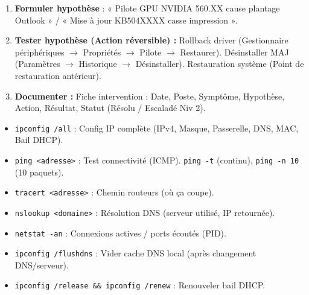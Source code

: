 \documentclass[11pt]{article}
\begin{document}
\begin{methode}
\begin{enumerate}
\begin{enumerate}
\begin{itemize}
                            \item \textbf{Réseau ?} \texttt{ping 1.1.1.1}, \texttt{ping google.fr} (DNS), \texttt{ipconfig /all} (IP, Passerelle, DNS).
                        \end{itemize}
                  \item \textbf{Formuler hypothèse} : « Pilote GPU NVIDIA 560.XX cause plantage Outlook » / « Mise à jour KB504XXXX casse impression ».
                  \item \textbf{Tester hypothèse (Action réversible) :} Rollback driver (Gestionnaire périphériques $\rightarrow$ Propriétés $\rightarrow$ Pilote $\rightarrow$ Restaurer). Désinstaller MAJ (Paramètres $\rightarrow$ Historique $\rightarrow$ Désinstaller). Restauration système (Point de restauration antérieur).
                  \item \textbf{Documenter :} Fiche intervention : Date, Poste, Symptôme, Hypothèse, Action, Résultat, Statut (Résolu / Escaladé Niv 2).
              \end{enumerate}
    \end{enumerate}
\end{methode}

\begin{methode}
    \begin{itemize}
        \item \texttt{ipconfig /all} : Config IP complète (IPv4, Masque, Passerelle, DNS, MAC, Bail DHCP).
        \item \texttt{ping <adresse>} : Test connectivité (ICMP). \texttt{ping -t} (continu), \texttt{ping -n 10} (10 paquets).
        \item \texttt{tracert <adresse>} : Chemin routeurs (où ça coupe).
        \item \texttt{nslookup <domaine>} : Résolution DNS (serveur utilisé, IP retournée).
        \item \texttt{netstat -an} : Connexions actives / ports écoutés (PID).
        \item \texttt{ipconfig /flushdns} : Vider cache DNS local (après changement DNS/serveur).
        \item \texttt{ipconfig /release \&\& ipconfig /renew} : Renouveler bail DHCP.
    \end{itemize}
\end{methode}
\end{document}
